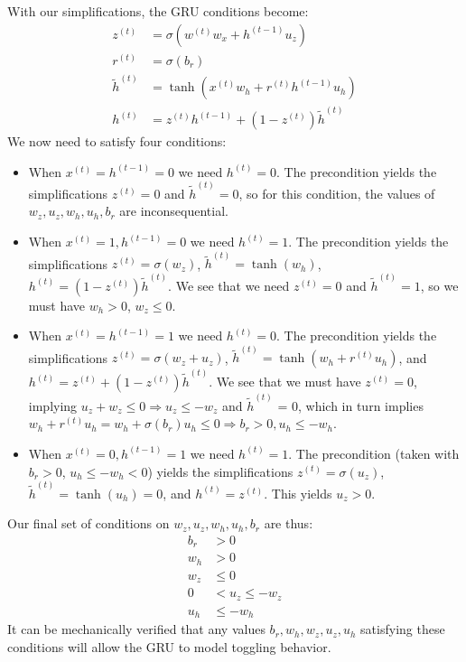 \documentclass{article}
\begin{document}
\begin{itemize}
With our simplifications, the GRU conditions become:
\begin{align*}
z^{(t)} &= \sigma(w^{(t)}w_x + h^{(t-1)}u_z) \\
r^{(t)} &= \sigma(b_r) \\
\tilde{h}^{(t)} &= \tanh(x^{(t)}w_h + r^{(t)}h^{(t-1)}u_h) \\
h^{(t)} &= z^{(t)}h^{(t-1)} + (1 - z^{(t)})\tilde{h}^{(t)}
\end{align*}
We now need to satisfy four conditions:
\begin{itemize}
\item When $x^{(t)} = h^{(t-1)} = 0$ we need $h^{(t)} = 0$. The precondition yields the simplifications $z^{(t)} = 0$ and $\tilde{h}^{(t)} = 0$, so for this condition, the values of $w_z, u_z, w_h, u_h, b_r$ are inconsequential.
\item When $x^{(t)} = 1, h^{(t-1)} = 0$ we need $h^{(t)} = 1$. The precondition yields the simplifications $z^{(t)} = \sigma(w_z)$, $\tilde{h}^{(t)} = \tanh(w_h)$, $h^{(t)} = (1 - z^{(t)})\tilde{h}^{(t)}.$ We see that we need $z^{(t)} = 0$ and $\tilde{h}^{(t)} = 1$, so we must have $w_h > 0$, $w_z \le 0$.
\item When $x^{(t)} = h^{(t-1)} = 1$ we need $h^{(t)} = 0$. The precondition yields the simplifications $z^{(t)} = \sigma(w_z + u_z)$, $\tilde{h}^{(t)} = \tanh(w_h + r^{(t)}u_h)$, and $h^{(t)} = z^{(t)} + (1 - z^{(t)})\tilde{h}^{(t)}$. We see that we must have $z^{(t)} = 0$, implying $u_z + w_z \le 0 \Rightarrow u_z \le -w_z$ and $\tilde{h}^{(t)}$ = 0, which in turn implies $w_h + r^{(t)}u_h = w_h + \sigma(b_r)u_h \le 0 \Rightarrow b_r > 0, u_h \le -w_h$.
\item When $x^{(t)} = 0, h^{(t-1)} = 1$ we need $h^{(t)} = 1$. The precondition (taken with $b_r > 0$, $u_h \le -w_h < 0$) yields the simplifications $z^{(t)} = \sigma(u_z)$, $\tilde{h}^{(t)} = \tanh(u_h) = 0$, and $h^{(t)} = z^{(t)}$. This yields $u_z > 0$.
\end{itemize}
Our final set of conditions on $w_z, u_z, w_h, u_h, b_r$ are thus:
\begin{align*}
b_r &> 0 \\
w_h &> 0 \\
w_z &\le 0 \\
0 &< u_z \le -w_z \\
u_h &\le -w_h
\end{align*}
It can be mechanically verified that any values $b_r, w_h, w_z, u_z, u_h$ satisfying these conditions will allow the GRU to model toggling behavior.
\end{itemize}
\end{document}
